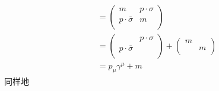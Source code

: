 \begin{equation}
\begin{aligned}
&=\left( \begin{matrix}
	m&		p\cdot \sigma\\
	p\cdot \bar{\sigma}&		m\\
\end{matrix} \right) 
\\
&=\left( \begin{matrix}
	&		p\cdot \sigma\\
	p\cdot \bar{\sigma}&		\\
\end{matrix} \right) +\left( \begin{matrix}
	m&		\\
	&		m\\
\end{matrix} \right) 
\\
&=p_{\mu}\gamma ^{\mu}+m
    \end{aligned}
\end{equation}
同样地
